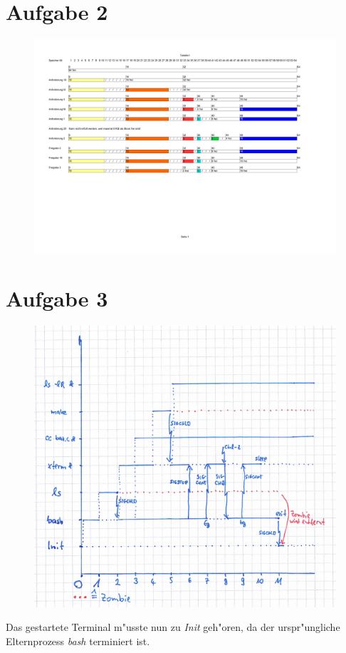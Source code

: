 \documentclass{ti2}
\begin{document}
\section*{Aufgabe 2}
\begin{figure}[h]
\includegraphics[width=1.25\textwidth]{Aufgabe_2.pdf}
\end{figure}
\clearpage
\section*{Aufgabe 3}
\begin{figure}[h]
\includegraphics[width=1.1\textwidth]{pic.png}
\end{figure}
Das gestartete Terminal m"usste nun zu \emph{Init} geh"oren, da der urspr"ungliche Elternprozess \emph{bash} terminiert ist.
\end{document}
